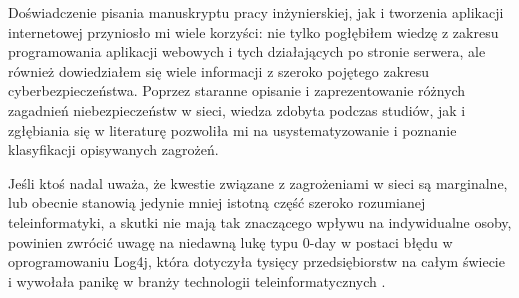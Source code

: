 \documentclass[12pt,twoside]{article}
\begin{document}
Doświadczenie pisania manuskryptu pracy inżynierskiej, jak i tworzenia aplikacji internetowej przyniosło mi wiele korzyści: nie tylko pogłębiłem wiedzę z zakresu programowania aplikacji webowych i tych działających po stronie serwera, ale również dowiedziałem się wiele informacji z szeroko pojętego zakresu cyberbezpieczeństwa. Poprzez staranne opisanie i zaprezentowanie różnych zagadnień niebezpieczeństw w sieci, wiedza zdobyta podczas studiów, jak i zgłębiania się w literaturę pozwoliła mi na usystematyzowanie i poznanie klasyfikacji opisywanych zagrożeń. 

Jeśli ktoś nadal uważa, że kwestie związane z zagrożeniami w sieci są marginalne, lub obecnie stanowią jedynie mniej istotną część szeroko rozumianej teleinformatyki, a skutki nie mają tak znaczącego wpływu na indywidualne osoby, powinien zwrócić uwagę na niedawną lukę typu 0-day w postaci błędu w oprogramowaniu Log4j, która dotyczyła tysięcy przedsiębiorstw na całym świecie i wywołała panikę w branży technologii teleinformatycznych \cite{Log4j}.

\clearpage

\end{document}
